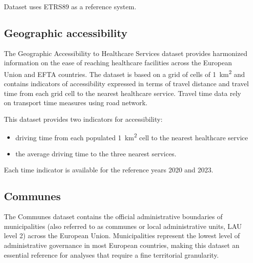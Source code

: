 Dataset uses ETRS89 as a reference system.


\subsection{Geographic accessibility}
\label{subsec:geo_acc_datas_pres}

The Geographic Accessibility to Healthcare Services dataset provides harmonized information on the ease of reaching healthcare facilities across the European Union and EFTA countries. 
The dataset is based on a grid of cells of \qty{1}{km^2} and contains indicators of accessibility expressed in terms of travel distance and travel time from each grid cell to the nearest healthcare service.
Travel time data rely on transport time measures using road network.

This dataset provides two indicators for accessibility:
\begin{itemize}
	\item driving time from each populated \qty{1}{km^2} cell to the nearest healthcare service
	\item the average driving time to the three nearest services.
\end{itemize}

Each time indicator is available for the reference years 2020 and 2023.

\subsection{Communes}

The Communes dataset contains the official administrative boundaries of municipalities (also referred to as communes or local administrative units, LAU level 2) across the European Union. 
Municipalities represent the lowest level of administrative governance in most European countries, making this dataset an essential reference for analyses that require a fine territorial granularity.

